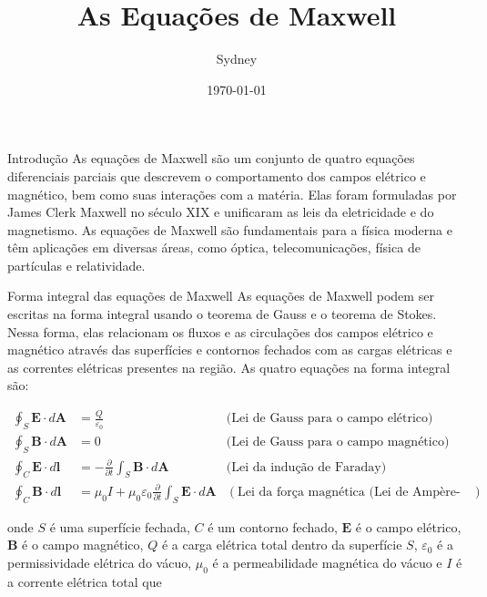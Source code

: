 \documentclass{beamer}
\title{As Equações de Maxwell}
\author{Sydney}
\date{\today}
\begin{document}
\begin{frame}
  \titlepage
\end{frame}

\begin{frame}{Introdução}
  As equações de Maxwell são um conjunto de quatro equações diferenciais parciais que descrevem o comportamento dos campos elétrico e magnético, bem como suas interações com a matéria. Elas foram formuladas por James Clerk Maxwell no século XIX e unificaram as leis da eletricidade e do magnetismo. As equações de Maxwell são fundamentais para a física moderna e têm aplicações em diversas áreas, como óptica, telecomunicações, física de partículas e relatividade.
\end{frame}

\begin{frame}{Forma integral das equações de Maxwell}
  As equações de Maxwell podem ser escritas na forma integral usando o teorema de Gauss e o teorema de Stokes. Nessa forma, elas relacionam os fluxos e as circulações dos campos elétrico e magnético através das superfícies e contornos fechados com as cargas elétricas e as correntes elétricas presentes na região. As quatro equações na forma integral são:

  \begin{align*}
    \oint_S \mathbf{E} \cdot d\mathbf{A} &= \frac{Q}{\varepsilon_0} & \text{(Lei de Gauss para o campo elétrico)} \\
    \oint_S \mathbf{B} \cdot d\mathbf{A} &= 0 & \text{(Lei de Gauss para o campo magnético)} \\
    \oint_C \mathbf{E} \cdot d\mathbf{l} &= - \frac{\partial}{\partial t} \int_S \mathbf{B} \cdot d\mathbf{A} & \text{(Lei da indução de Faraday)} \\
    \oint_C \mathbf{B} \cdot d\mathbf{l} &= \mu_0 I + \mu_0\varepsilon_0 	\frac{\partial}{\partial t}\int_S		\mathbf {E}\cdot d{\mathbf {A}} &		(\text {Lei da força magnética (Lei de Ampère-Maxwell)})
  \end{align*}

  onde $S$ é uma superfície fechada, $C$ é um contorno fechado, $\mathbf E$ é o campo elétrico, $\mathbf B$ é o campo magnético, $Q$ é a carga elétrica total dentro da superfície $S$, $\varepsilon_0$ é a permissividade elétrica do vácuo, $\mu_0$ é a permeabilidade magnética do vácuo e $I$ é a corrente elétrica total que 
\end{frame}
\end{document}
